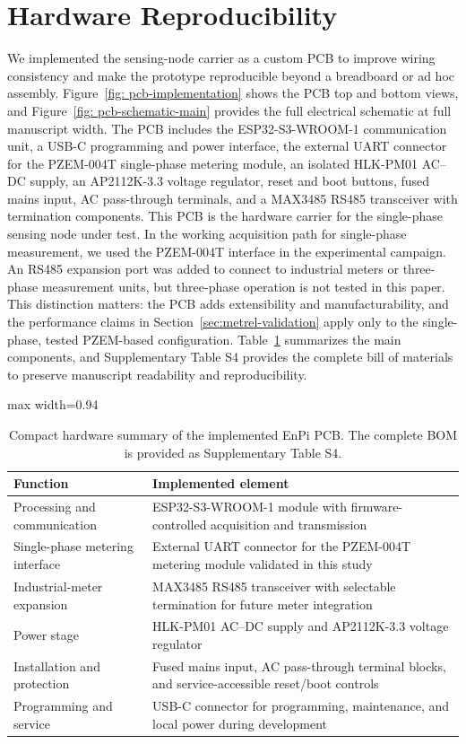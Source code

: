 \documentclass[technologies,article,submit,pdftex,moreauthors]{Definitions/mdpi}
\begin{document}
\section{Hardware Reproducibility}
\label{sec:hardware-reproducibility}
We implemented the sensing-node carrier as a custom PCB to improve wiring consistency and make the prototype reproducible beyond a breadboard or ad hoc assembly. Figure~\ref {fig: pcb-implementation} shows the PCB top and bottom views, and Figure~\ref{fig: pcb-schematic-main} provides the full electrical schematic at full manuscript width. The PCB includes the ESP32-S3-WROOM-1 communication unit, a USB-C programming and power interface, the external UART connector for the PZEM-004T single-phase metering module, an isolated HLK-PM01 AC--DC supply, an AP2112K-3.3 voltage regulator, reset and boot buttons, fused mains input, AC pass-through terminals, and a MAX3485 RS485 transceiver with termination components. This PCB is the hardware carrier for the single-phase sensing node under test. In the working acquisition path for single-phase measurement, we used the PZEM-004T interface in the experimental campaign. An RS485 expansion port was added to connect to industrial meters or three-phase measurement units, but three-phase operation is not tested in this paper. This distinction matters: the PCB adds extensibility and manufacturability, and the performance claims in Section~\ref{sec:metrel-validation} apply only to the single-phase, tested PZEM-based configuration. Table~\ref{tab:pcb-component-summary} summarizes the main components, and Supplementary Table S4 provides the complete bill of materials to preserve manuscript readability and reproducibility. 

\begin{table}[H]
\caption{Compact hardware summary of the implemented EnPi PCB. The complete BOM is provided as Supplementary Table S4.}
\label{tab:pcb-component-summary}
\centering
\scriptsize
\begin{adjustbox}{max width=0.94\columnwidth}
\begin{tabular}{p{}p{}}
\toprule
Function & Implemented element \\
\midrule
Processing and communication & ESP32-S3-WROOM-1 module with firmware-controlled acquisition and transmission \\
Single-phase metering interface & External UART connector for the PZEM-004T metering module validated in this study \\
Industrial-meter expansion & MAX3485 RS485 transceiver with selectable termination for future meter integration \\
Power stage & HLK-PM01 AC--DC supply and AP2112K-3.3 voltage regulator \\
Installation and protection & Fused mains input, AC pass-through terminal blocks, and service-accessible reset/boot controls \\
Programming and service & USB-C connector for programming, maintenance, and local power during development \\
\bottomrule
\end{tabular}
\end{adjustbox}
\end{table}
\end{document}
